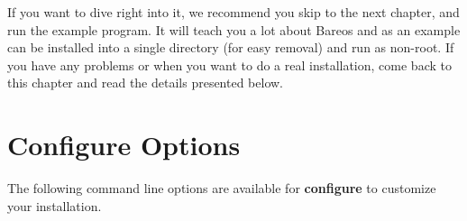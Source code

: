 If you want to dive right into it, we recommend you skip to the next chapter,
and run the example program. It will teach you a lot about Bareos and as an
example can be installed into a single directory (for easy removal) and run as
non-root. If you have any problems or when you want to do a real installation,
come back to this chapter and read the details presented below.

\section{Configure Options}
\label{Options}

The following command line options are available for {\bf configure} to
customize your installation.

